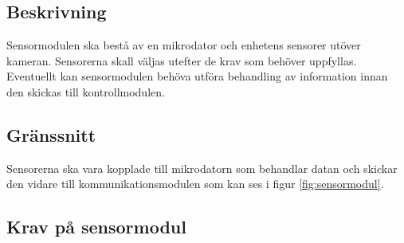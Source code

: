 \documentclass[kravspec/krav.tex]{subfiles}
\begin{document}
\subsection{Beskrivning}
Sensormodulen ska bestå av en mikrodator och enhetens sensorer utöver kameran.
Sensorerna skall väljas utefter de krav som behöver uppfyllas. Eventuellt kan
sensormodulen behöva utföra behandling av information innan den skickas till
kontrollmodulen.

\subsection{Gränssnitt}
Sensorerna ska vara kopplade till mikrodatorn som behandlar datan och skickar
den vidare till kommunikationsmodulen som kan ses i figur
\ref{fig:sensormodul}.

\subsection{Krav på sensormodul}
\begin{reqlist}
\end{reqlist}
\end{document}
